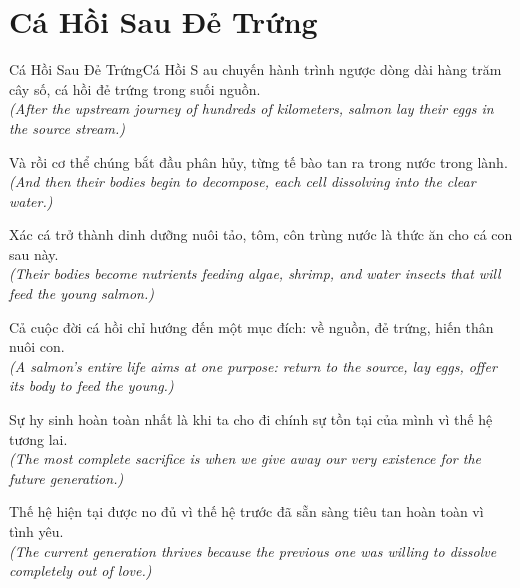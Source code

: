 \section{Cá Hồi Sau Đẻ Trứng}
\begin{truyen}{Cá Hồi Sau Đẻ Trứng}{Cá Hồi}
S au chuyến hành trình ngược dòng dài hàng trăm cây số, cá hồi đẻ trứng trong suối nguồn.\\
\textit{(After the upstream journey of hundreds of kilometers, salmon lay their eggs in the source stream.)}

Và rồi cơ thể chúng bắt đầu phân hủy, từng tế bào tan ra trong nước trong lành.\\
\textit{(And then their bodies begin to decompose, each cell dissolving into the clear water.)}

Xác cá trở thành dinh dưỡng nuôi tảo, tôm, côn trùng nước là thức ăn cho cá con sau này.\\
\textit{(Their bodies become nutrients feeding algae, shrimp, and water insects that will feed the young salmon.)}

Cả cuộc đời cá hồi chỉ hướng đến một mục đích: về nguồn, đẻ trứng, hiến thân nuôi con.\\
\textit{(A salmon's entire life aims at one purpose: return to the source, lay eggs, offer its body to feed the young.)}

Sự hy sinh hoàn toàn nhất là khi ta cho đi chính sự tồn tại của mình vì thế hệ tương lai.\\
\textit{(The most complete sacrifice is when we give away our very existence for the future generation.)}

\end{truyen}
\begin{baihoc}
  Thế hệ hiện tại được no đủ vì thế hệ trước đã sẵn sàng tiêu tan hoàn toàn vì tình yêu.\\
  \textit{(The current generation thrives because the previous one was willing to dissolve completely out of love.)}
\end{baihoc}

